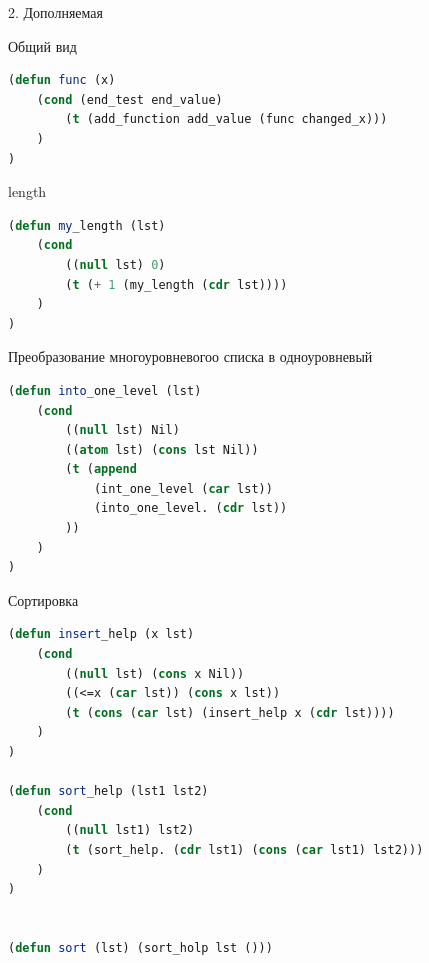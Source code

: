 \documentclass[12pt]{report}
\begin{document}
2. Дополняемая 

Общий вид

\begin{lstlisting}[language=Lisp]
(defun func (x)
	(cond (end_test end_value)
		(t (add_function add_value (func changed_x)))
	)
)
\end{lstlisting}


length

\begin{lstlisting}[language=Lisp]
(defun my_length (lst)
	(cond 
		((null lst) 0)
		(t (+ 1 (my_length (cdr lst))))
	)
)
\end{lstlisting}


Преобразование многоуровневогоо списка в одноуровневый

\begin{lstlisting}[language=Lisp]
(defun into_one_level (lst)
	(cond 
		((null lst) Nil)
		((atom lst) (cons lst Nil))
		(t (append 
			(int_one_level (car lst))
			(into_one_level. (cdr lst))
		))
	)
)
\end{lstlisting}



Сортировка


\begin{lstlisting}[language=Lisp]
(defun insert_help (x lst)
	(cond
		((null lst) (cons x Nil))
		((<=x (car lst)) (cons x lst))
		(t (cons (car lst) (insert_help x (cdr lst))))
	)
)

(defun sort_help (lst1 lst2)
	(cond
		((null lst1) lst2)
		(t (sort_help. (cdr lst1) (cons (car lst1) lst2)))
	)
)


(defun sort (lst) (sort_holp lst ()))
\end{lstlisting}




\begin{lstlisting}[language=Lisp]

\end{lstlisting}
\end{document}
